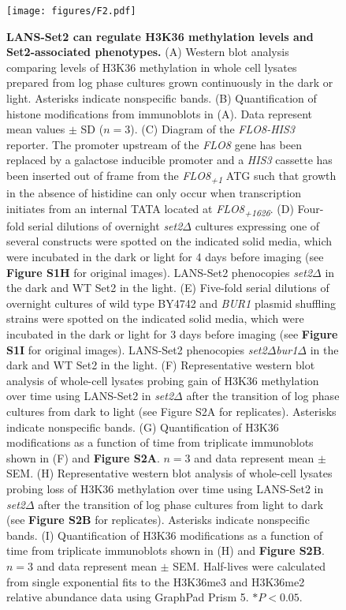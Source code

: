 \documentclass[12pt]{biorxiv}
\newcommand{\setdelt}{\emph{set2$\Delta$}\xspace}
\newcommand{\setdeltburdelt}{\emph{set2$\Delta$bur1$\Delta$}\xspace}
\begin{document}
\begin{spacing}{2}
\begin{figure}
\center
\texttt{[image: figures/F2.pdf]}
\vspace*{2mm}
\caption{\textbf{LANS-Set2 can regulate H3K36 methylation levels and Set2-associated phenotypes.} (A) Western blot analysis comparing levels of H3K36 methylation in whole cell lysates prepared from log phase cultures grown continuously in the dark or light. Asterisks indicate nonspecific bands. (B) Quantification of histone modifications from immunoblots in (A). Data represent mean values $\pm$ SD ($n = 3$). (C) Diagram of the \textit{FLO8-HIS3} reporter. The promoter upstream of the \textit{FLO8} gene has been replaced by a galactose inducible promoter and a \textit{HIS3} cassette has been inserted out of frame from the \textit{FLO8}\textsubscript{\textit{+1}} ATG such that growth in the absence of histidine can only occur when transcription initiates from an internal TATA located at \textit{FLO8}\textsubscript{\textit{+1626}}. (D) Four-fold serial dilutions of overnight \setdelt cultures expressing one of several constructs were spotted on the indicated solid media, which were incubated in the dark or light for 4 days before imaging (see \textbf{Figure S1H} for original images). LANS-Set2 phenocopies \setdelt in the dark and WT Set2 in the light. (E) Five-fold serial dilutions of overnight cultures of wild type BY4742 and \textit{BUR1} plasmid shuffling strains were spotted on the indicated solid media, which were incubated in the dark or light for 3 days before imaging (see \textbf{Figure S1I} for original images). LANS-Set2 phenocopies \setdeltburdelt in the dark and WT Set2 in the light. (F) Representative western blot analysis of whole-cell lysates probing gain of H3K36 methylation over time using LANS-Set2 in \setdelt after the transition of log phase cultures from dark to light (see Figure S2A for replicates). Asterisks indicate nonspecific bands. (G) Quantification of H3K36 modifications as a function of time from triplicate immunoblots shown in (F) and \textbf{Figure S2A}. $n = 3$ and data represent mean $\pm$ SEM.  (H) Representative western blot analysis of whole-cell lysates probing loss of H3K36 methylation over time using LANS-Set2 in \setdelt after the transition of log phase cultures from light to dark (see \textbf{Figure S2B} for replicates). Asterisks indicate nonspecific bands. (I) Quantification of H3K36 modifications as a function of time from triplicate immunoblots shown in (H) and \textbf{Figure S2B}. $n = 3$ and data represent mean $\pm$ SEM.  Half-lives were calculated from single exponential fits to the H3K36me3 and H3K36me2 relative abundance data using GraphPad Prism 5. $\ast P < 0.05$.}
\end{figure}


\end{spacing}
\end{document}
